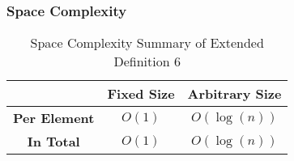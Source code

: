 \documentclass[conference]{IEEEtran}
\begin{document}
\subsubsection{Space Complexity}

\begin{table}[H]
    \centering
    \caption{Space Complexity Summary of Extended Definition 6}
    \begin{tabular}{|c|c|c|}
        \hline
        & \textbf{Fixed Size} & \textbf{Arbitrary Size} \\
        \hline
        \textbf{Per Element} & $O(1)$ & $O(\log(n))$ \\
        \hline
        \textbf{In Total} & $O(1)$ & $O(\log(n))$ \\
        \hline
    \end{tabular}
    \label{tab:space_pn_d06}
\end{table}



\onecolumn
\lstset{basicstyle=\ttfamily, breaklines=true}

\end{document}
